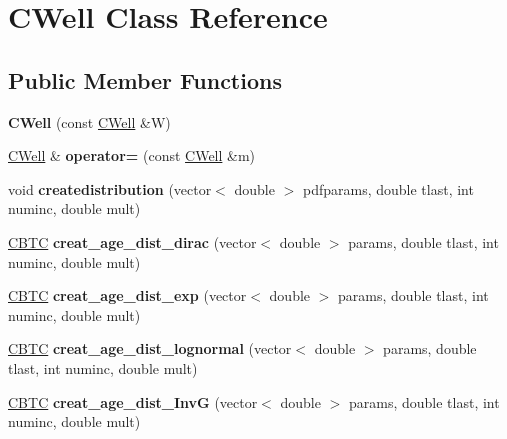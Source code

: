 \hypertarget{class_c_well}{}\section{C\+Well Class Reference}
\label{class_c_well}
\subsection*{Public Member Functions}
\begin{DoxyCompactItemize}
\item 
\mbox{\label{class_c_well_ac75249256fc3793b7512693dc6db3a8a}} 
{\bfseries C\+Well} (const \hyperlink{class_c_well}{C\+Well} \&W)
\item 
\mbox{\label{class_c_well_a99d77ace2bafe7c8fa2b85ae563a8b68}} 
\hyperlink{class_c_well}{C\+Well} \& {\bfseries operator=} (const \hyperlink{class_c_well}{C\+Well} \&m)
\item 
\mbox{\label{class_c_well_a0d149263efd265c95260e5b0f372fc28}} 
void {\bfseries createdistribution} (vector$<$ double $>$ pdfparams, double tlast, int numinc, double mult)
\item 
\mbox{\label{class_c_well_aca59c7fb5853027888410954bdc41fcf}} 
\hyperlink{class_c_b_t_c}{C\+B\+TC} {\bfseries creat\+\_\+age\+\_\+dist\+\_\+dirac} (vector$<$ double $>$ params, double tlast, int numinc, double mult)
\item 
\mbox{\label{class_c_well_ae07d68261c556e3c4a0f91bfb4f45d20}} 
\hyperlink{class_c_b_t_c}{C\+B\+TC} {\bfseries creat\+\_\+age\+\_\+dist\+\_\+exp} (vector$<$ double $>$ params, double tlast, int numinc, double mult)
\item 
\mbox{\label{class_c_well_aeac31eeac3e7d3df0273c1cac35fb213}} 
\hyperlink{class_c_b_t_c}{C\+B\+TC} {\bfseries creat\+\_\+age\+\_\+dist\+\_\+lognormal} (vector$<$ double $>$ params, double tlast, int numinc, double mult)
\item 
\mbox{\label{class_c_well_ab925408c1d0311b4d03aa9d1a575b11f}} 
\hyperlink{class_c_b_t_c}{C\+B\+TC} {\bfseries creat\+\_\+age\+\_\+dist\+\_\+\+InvG} (vector$<$ double $>$ params, double tlast, int numinc, double mult)

\end{DoxyCompactItemize}

